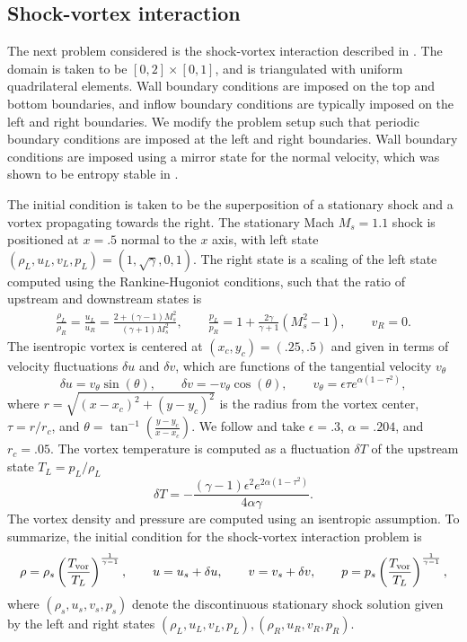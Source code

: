 \documentclass[onefignum,onetabnum,final]{siamart171218}
\newcommand{\LRp}[1]{\left( #1 \right)}
\begin{document}
\subsection{Shock-vortex interaction}

The next problem considered is the shock-vortex interaction described in \cite{shu1998essentially}.  The domain is taken to be $[0,2]\times [0,1]$, and is triangulated with uniform quadrilateral elements.  Wall boundary conditions are imposed on the top and bottom boundaries, and inflow boundary conditions are typically imposed on the left and right boundaries.  We modify the problem setup such that periodic boundary conditions are imposed at the left and right boundaries.  Wall boundary conditions are imposed using a mirror state for the normal velocity, which was shown to be entropy stable in \cite{svard2014entropy, chen2017entropy}.  

The initial condition is taken to be the superposition of a stationary shock and a vortex propagating towards the right.  The stationary Mach $M_s = 1.1$ shock is positioned at $x = .5$ normal to the $x$ axis, with left state $\LRp{\rho_L, u_L, v_L, p_L} = \LRp{1, \sqrt{\gamma}, 0, 1}$.  The right state is a scaling of the left state computed using the Rankine-Hugoniot conditions, such that the ratio of upstream and downstream states is
\begin{align*}
\frac{\rho_L}{\rho_R} = \frac{u_L}{u_R} = \frac{2+ (\gamma-1) M_s^2}{(\gamma+1)M_s^2}, \qquad \frac{p_L}{p_R} = 1+ \frac{2\gamma}{\gamma+1}\LRp{M_s^2-1}, \qquad v_R = 0.
\end{align*}
The isentropic vortex is centered at $(x_c,y_c) = (.25, .5)$ and given in terms of velocity fluctuations $\delta u$ and $\delta v$, which are functions of the tangential velocity $v_{\theta}$
\[
\delta u = v_{\theta} \sin(\theta), \qquad
\delta v = -v_{\theta} \cos(\theta), \qquad
v_{\theta} = \epsilon \tau e^{\alpha(1-\tau^2)},
\]
where $r = \sqrt{(x-x_c)^2 + (y-y_c)^2}$ is the radius from the vortex center, $\tau = r/r_c$, and $\theta = \tan^{-1}\LRp{\frac{y-y_c}{x-x_c}}$.  We follow \cite{shu1998essentially} and take $\epsilon = .3$, $\alpha = .204$, and $r_c = .05$.  The vortex temperature is computed as a fluctuation $\delta T$ of the upstream state $T_L = p_L/\rho_L$
\[
\delta T =  - \frac{(\gamma-1)\epsilon^2 e^{2\alpha (1-\tau^2)}}{4\alpha\gamma}.  
\]
The vortex density and pressure are computed using an isentropic assumption.  To summarize, the initial condition for the shock-vortex interaction problem is 
\begin{gather*}
\rho = \rho_s \LRp{\frac{T_{\rm vor}}{T_L}}^{\frac{1}{\gamma-1}}, \qquad u = u_s + \delta u, \qquad v = v_s + \delta v, \qquad p = p_s \LRp{\frac{T_{\rm vor}}{T_L}}^{\frac{1}{\gamma-1}},
\end{gather*}
where $(\rho_s,  u_s, v_s, p_s)$ denote the discontinuous stationary shock solution given by the left and right states $\LRp{\rho_L, u_L, v_L, p_L}, \LRp{\rho_R, u_R, v_R, p_R}$.  
\end{document}
